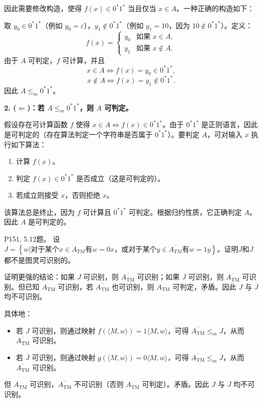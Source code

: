 \documentclass[11pt,addpoints,answers]{exam}
\begin{document}
\begin{questions}
\begin{solution}
    因此需要修改构造，使得 $f(x) \in 0^*1^*$ 当且仅当 $x \in A$。一种正确的构造如下：
    
    取 $y_0 \in 0^*1^*$（例如 $y_0 = \varepsilon$），$y_1 \notin 0^*1^*$（例如 $y_1 = 10$，因为 $10 \notin 0^*1^*$）。定义：
    \[
    f(x) = 
    \begin{cases}
    y_0 & \text{如果 } x \in A, \\
    y_1 & \text{如果 } x \notin A.
    \end{cases}
    \]
    由于 $A$ 可判定，$f$ 可计算，并且
    \[
    x \in A \iff f(x) = y_0 \in 0^*1^*,
    \]
    \[
    x \notin A \iff f(x) = y_1 \notin 0^*1^*.
    \]
    因此 $A \leq_m 0^*1^*$。
    
    \vspace{1em}
    \noindent \textbf{2. ($\Leftarrow$)：若 $A \leq_m 0^*1^*$，则 $A$ 可判定。}
    
    假设存在可计算函数 $f$ 使得 $x \in A \iff f(x) \in 0^*1^*$。由于 $0^*1^*$ 是正则语言，因此是可判定的（存在算法判定一个字符串是否属于 $0^*1^*$）。要判定 $A$，可对输入 $x$ 执行如下算法：
    \begin{enumerate}
        \item 计算 $f(x)$。
        \item 判定 $f(x) \in 0^*1^*$ 是否成立（这是可判定的）。
        \item 若成立则接受 $x$，否则拒绝 $x$。
    \end{enumerate}
    该算法总是终止，因为 $f$ 可计算且 $0^*1^*$ 可判定。根据归约性质，它正确判定 $A$。因此 $A$ 是可判定的。
\end{solution}


\question P151, 5.12题。
设$J=\left\{w|\text{对于某个}x\in A_{\textit{TM}}\text{有}w=0x\text{，或对于某个}y\in \overline{A_{\textit{TM}}} \text{有} w=1y \right\}$。证明$J$和$\overline J$都不是图灵可识别的。
\begin{solution}

    证明更强的结论：如果 $J$ 可识别，则 $\overline{A_{\text{TM}}}$ 可识别；如果 $\overline{J}$ 可识别，则 $\overline{A_{\text{TM}}}$ 可识别。但已知 $A_{\text{TM}}$ 可识别，若 $\overline{A_{\text{TM}}}$ 也可识别，则 $A_{\text{TM}}$ 可判定，矛盾。因此 $J$ 与 $\overline{J}$ 均不可识别。
    
    具体地：
    \begin{itemize}
    \item 若 $J$ 可识别，则通过映射 $f(\langle M,w\rangle) = 1\langle M,w\rangle$，可得 $\overline{A_{\text{TM}}} \leq_m J$，从而 $\overline{A_{\text{TM}}}$ 可识别。
    \item 若 $\overline{J}$ 可识别，则通过映射 $g(\langle M,w\rangle) = 0\langle M,w\rangle$，可得 $\overline{A_{\text{TM}}} \leq_m \overline{J}$，从而 $\overline{A_{\text{TM}}}$ 可识别。
    \end{itemize}
    但 $A_{\text{TM}}$ 可识别，$\overline{A_{\text{TM}}}$ 不可识别（否则 $A_{\text{TM}}$ 可判定）。矛盾。因此 $J$ 与 $\overline{J}$ 均不可识别。
\end{solution}



\end{questions}
\end{document}
